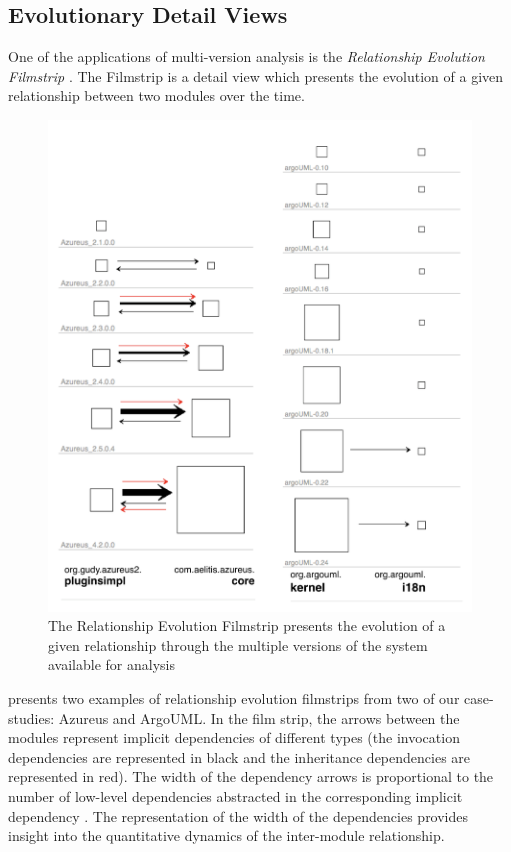 \documentclass[preprint,12pt]{elsarticle}
\begin{document}
\newpage
\subsection {Evolutionary Detail Views}
One of the applications of multi-version analysis is the {\em Relationship Evolution Filmstrip} \cite{lungu-relevo}. The Filmstrip is a detail view which presents the evolution of a given relationship between two modules over the time. %

\begin{figure}[h]
\begin{center}
\includegraphics[width=0.8\linewidth]{images/Filmstrip}
\caption{The Relationship Evolution Filmstrip presents the evolution of a given relationship through the multiple versions of the system available for analysis}
\end{center}
\end{figure}


 presents two examples of relationship evolution filmstrips from two of our case-studies: Azureus and ArgoUML. In the film strip, the arrows between the modules represent implicit dependencies of different types (the invocation dependencies are represented in black and the inheritance dependencies are represented in red). The width of the dependency arrows is proportional to the number of low-level dependencies abstracted in the corresponding implicit dependency \cite{lungu-relevo}. The representation of the width of the dependencies provides insight into the quantitative dynamics of the inter-module relationship.
\end{document}
